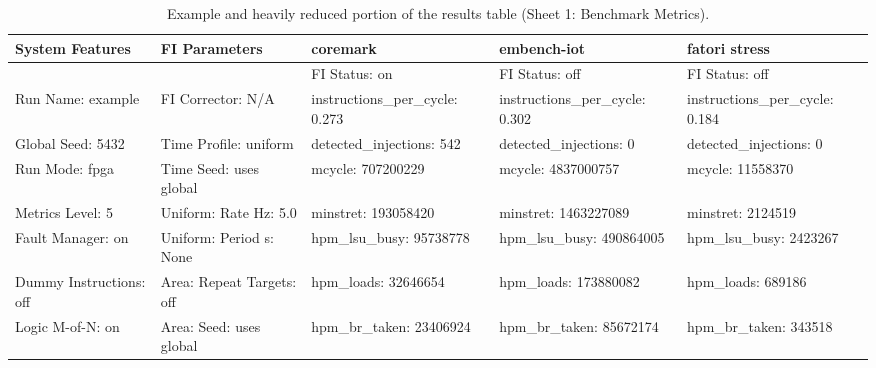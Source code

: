 \begin{table}[h]
\centering
\scriptsize
\setlength{\tabcolsep}{3.2pt}
\renewcommand{\arraystretch}{1.25}
\begin{tabularx}{\textwidth}{|X|X|X|X|X|}
\hline
\rowcolor{tableheader}\textbf{System Features} &
\textbf{FI Parameters} &
\textbf{coremark} &
\textbf{embench-iot} &
\textbf{fatori stress} \\
\hline
\hline
&
&
FI Status: on &
FI Status: off &
FI Status: off \\
\hline
Run Name: example &
FI Corrector: N/A &
instructions\_per\_cycle: 0.273 &
instructions\_per\_cycle: 0.302 &
instructions\_per\_cycle: 0.184 \\
\hline
Global Seed: 5432 &
Time Profile: uniform &
detected\_injections: 542 &
detected\_injections: 0 &
detected\_injections: 0 \\
\hline
Run Mode: fpga &
Time Seed: uses global &
mcycle: 707200229 &
mcycle: 4837000757 &
mcycle: 11558370 \\
\hline
Metrics Level: 5 &
Uniform: Rate Hz: 5.0 &
minstret: 193058420 &
minstret: 1463227089 &
minstret: 2124519 \\
\hline
Fault Manager: on &
Uniform: Period s: None &
hpm\_lsu\_busy: 95738778 &
hpm\_lsu\_busy: 490864005 &
hpm\_lsu\_busy: 2423267 \\
\hline
Dummy Instructions: off &
Area: Repeat Targets: off &
hpm\_loads: 32646654 &
hpm\_loads: 173880082 &
hpm\_loads: 689186 \\
\hline
Logic M-of-N: on &
Area: Seed: uses global &
hpm\_br\_taken: 23406924 &
hpm\_br\_taken: 85672174 &
hpm\_br\_taken: 343518 \\
\hline
\end{tabularx}
\caption{Example and heavily reduced portion of the results table (Sheet 1: Benchmark Metrics).}
\label{tab:results_table_benchmark_excerpt}
\end{table}

